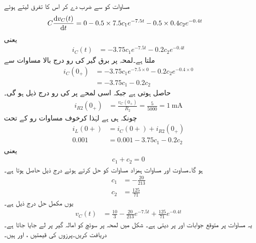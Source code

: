 مساوات  کو  سے ضرب دے کر اس کا تفرق لیتے ہوئے
\begin{align*}
C \frac{\dif v_C(t)}{\dif t}&=0-0.5\times 7.5c_1 e^{-7.5t}-0.5\times 0.4 c_2e^{-0.4t}
\end{align*}
یعنی
\begin{align*}
i_C(t)&=-3.75c_1 e^{-7.5t}-0.2 c_2e^{-0.4t}
\end{align*}
ملتا ہے۔لمحہ  پر برق گیر کی رو درج بالا مساوات سے
\begin{align*}
i_C(0_+)&=-3.75c_1 e^{-7.5\times 0}-0.2 c_2e^{-0.4\times 0}\\
&=-3.75c_1-0.2 c_2
\end{align*}
حاصل ہوتی ہے جبکہ اسی لمحے پر  کی رو درج ذیل ہو گی۔
\begin{align*}
i_{R2}(0_+)&=\frac{v_C(0_+)}{R_2}=\frac{5}{5000}=\SI{1}{\milli\ampere}
\end{align*}
چونکہ  ہی ہے لہٰذا کرخوف مساوات رو کے تحت
\begin{align*}
i_L(0+)&=i_C(0+)+i_{R2}(0_+)\\
0.001&=0.001-3.75c_1-0.2c_2
\end{align*}
یعنی
\begin{align}\label{مساوات_عارضی_مستقل_مثال_دس_ب}
c_1+c_2=0
\end{align}
ہو گا۔مساوت  اور مساوات  ہمزاد مساوات کو حل کرتے ہوئے درج ذیل حاصل ہوتا ہے۔
\begin{align*}
c_1&=-\frac{20}{213}\\
c_2&=\frac{125}{71}
\end{align*}
یوں مکمل حل درج ذیل ہے۔
\begin{align}
v_C(t)&=\frac{10}{3}-\frac{20}{213} e^{-7.5t}+\frac{125}{71}e^{-0.4t}
\end{align}
یہ مساوات  پر متوقع جوابات  اور  پر  دیتی ہے۔
شکل  میں لمحہ  پر سوئچ کو امالہ گیر پر لے جایا جاتا ہے۔ دریافت کریں۔پرزوں کی قیمتیں ،  اور  ہیں۔
